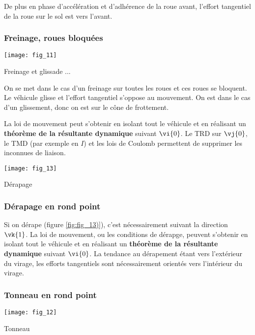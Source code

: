 De plus en phase d'accélération et d'adhérence de la roue avant, l'effort tangentiel de la roue sur le sol est vers l'avant. 

\subsubsection{Freinage, roues bloquées}

\begin{marginfigure}
\texttt{[image: fig\_11]}
\caption{Freinage et glissade ... \label{fig:fig_11}}
\end{marginfigure} 

On se met dans le cas d'un freinage sur toutes les roues et ces roues se bloquent. Le véhicule glisse et l'effort tangentiel s'oppose au mouvement. On est dans le cas d'un glissement, donc on est sur le cône de frottement. 

La loi de mouvement peut s'obtenir en isolant tout le véhicule et en réalisant un \textbf{théorème de la résultante dynamique} suivant $\vi{0}$. Le TRD sur $\vj{0}$, le TMD (par exemple en $I$) et les lois de Coulomb permettent de supprimer les inconnues de liaison.


\begin{marginfigure}
\texttt{[image: fig\_13]}
\caption{Dérapage \label{fig:fig_13}}
\end{marginfigure} 

\subsubsection{Dérapage en rond point}

Si on dérape (figure \ref{fig:fig_13)}), c'est nécessairement suivant la direction $\vk{1}$. La loi de mouvement, ou les conditions de dérapge, peuvent s'obtenir en isolant tout le véhicule et en réalisant un \textbf{théorème de la résultante dynamique} suivant $\vi{0}$. 
La tendance au dérapement étant vers l'extérieur du virage, les efforts tangentiels sont nécessairement orientés vers l'intérieur du virage.


\subsubsection{Tonneau en rond point}

\begin{marginfigure}
\texttt{[image: fig\_12]}
\caption{Tonneau \label{fig:fig_12}}
\end{marginfigure} 


